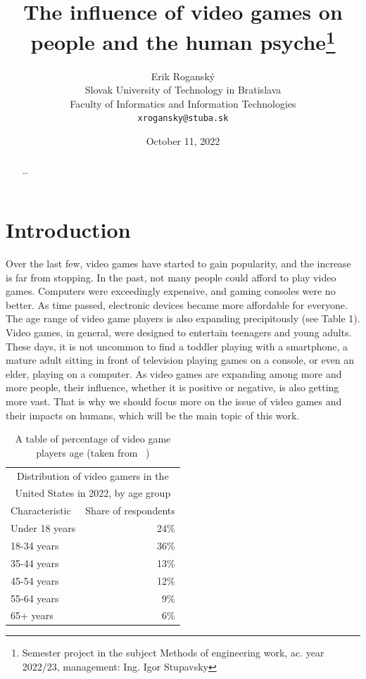 \documentclass[10pt,twoside,english,a4paper]{article}
\title{The influence of video games on people and the human psyche\thanks{Semester project in the subject Methods of engineering work, ac. year 2022/23, management: Ing. Igor Stupavsky}}
\author{Erik Roganský\\[2pt]
	{\small Slovak University of Technology in Bratislava}\\
	{\small Faculty of Informatics and Information Technologies}\\
	{\small \texttt{xrogansky@stuba.sk}}
	}
\date{\small October 11, 2022}
\begin{document}
\maketitle

\begin{abstract}
\ldots
\end{abstract}



\section{Introduction}
Over the last few, video games have started to gain popularity, and the increase is far from stopping. In the past, not many people could afford to play video games. Computers were exceedingly expensive, and gaming consoles were no better. As time passed, electronic devices became more affordable for everyone. The age range of video game players is also expanding precipitously (see Table 1). Video games, in general, were designed to entertain teenagers and young adults. These days, it is not uncommon to find a toddler playing with a smartphone, a mature adult sitting in front of television playing games on a console, or even an elder, playing on a computer. As video games are expanding among more and more people, their influence, whether it is positive or negative, is also getting more vast. That is why we should focus more on the issue of video games and their impacts on humans, which will be the main topic of this work.

\begin{table}[h]
\centering
\begin{tabular}{ |p{3cm} r| }
 \hline
 \multicolumn{2}{|c|}{Distribution of video gamers in the} \\
 \multicolumn{2}{|c|}{United States in 2022, by age group} \\
 \hline
 Characteristic & Share of respondents\\
 \hline
 Under 18 years & 24\%\\
 18-34 years & 36\%\\
 35-44 years & 13\%\\
 45-54 years & 12\%\\
 55-64 years & 9\%\\
 65+ years & 6\%\\
 \hline
\end{tabular}
\caption{A table of percentage of video game players age (taken from ~\cite{age2022})}
\end{table}
\end{document}
